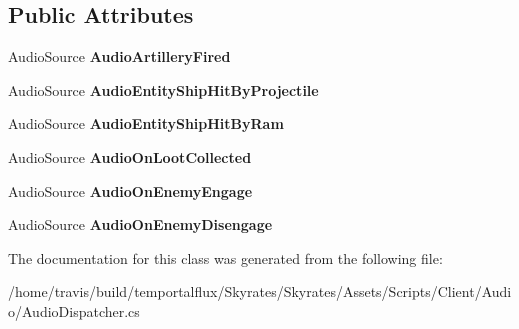 \subsection*{Public Attributes}
\begin{DoxyCompactItemize}
\item 
\hypertarget{class_skyrates_1_1_client_1_1_audio_dispatcher_ad996cff373d93efc72d30948bf5a30d7}{Audio\-Source {\bfseries Audio\-Artillery\-Fired}}\label{class_skyrates_1_1_client_1_1_audio_dispatcher_ad996cff373d93efc72d30948bf5a30d7}

\item 
\hypertarget{class_skyrates_1_1_client_1_1_audio_dispatcher_a3bcd016090038e5f09c8735ad5cba131}{Audio\-Source {\bfseries Audio\-Entity\-Ship\-Hit\-By\-Projectile}}\label{class_skyrates_1_1_client_1_1_audio_dispatcher_a3bcd016090038e5f09c8735ad5cba131}

\item 
\hypertarget{class_skyrates_1_1_client_1_1_audio_dispatcher_a67abfa1ba1df41fd20457865b10b9a4a}{Audio\-Source {\bfseries Audio\-Entity\-Ship\-Hit\-By\-Ram}}\label{class_skyrates_1_1_client_1_1_audio_dispatcher_a67abfa1ba1df41fd20457865b10b9a4a}

\item 
\hypertarget{class_skyrates_1_1_client_1_1_audio_dispatcher_ab8a146c252b56f67a02579b6b65bc299}{Audio\-Source {\bfseries Audio\-On\-Loot\-Collected}}\label{class_skyrates_1_1_client_1_1_audio_dispatcher_ab8a146c252b56f67a02579b6b65bc299}

\item 
\hypertarget{class_skyrates_1_1_client_1_1_audio_dispatcher_a2f4d4827e4638cf83404fc4f557bfef5}{Audio\-Source {\bfseries Audio\-On\-Enemy\-Engage}}\label{class_skyrates_1_1_client_1_1_audio_dispatcher_a2f4d4827e4638cf83404fc4f557bfef5}

\item 
\hypertarget{class_skyrates_1_1_client_1_1_audio_dispatcher_a12f9d81e7271cf0dae71482611df8e03}{Audio\-Source {\bfseries Audio\-On\-Enemy\-Disengage}}\label{class_skyrates_1_1_client_1_1_audio_dispatcher_a12f9d81e7271cf0dae71482611df8e03}

\end{DoxyCompactItemize}


The documentation for this class was generated from the following file\-:\begin{DoxyCompactItemize}
\item 
/home/travis/build/temportalflux/\-Skyrates/\-Skyrates/\-Assets/\-Scripts/\-Client/\-Audio/Audio\-Dispatcher.\-cs\end{DoxyCompactItemize}
